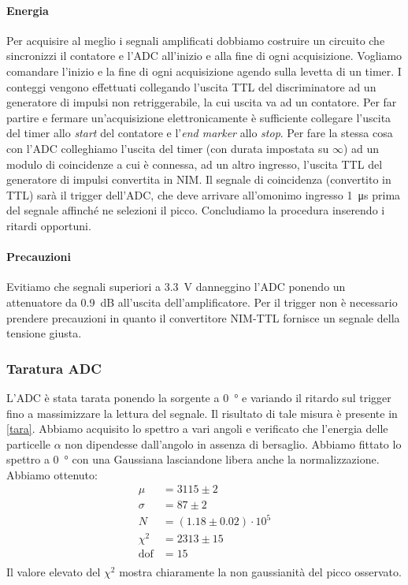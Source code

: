 \paragraph{Energia}
Per acquisire al meglio i segnali amplificati dobbiamo costruire un circuito che sincronizzi il contatore e l'ADC all'inizio e alla fine di ogni acquisizione.
Vogliamo comandare l'inizio e la fine di ogni acquisizione agendo sulla levetta di un timer.
I conteggi vengono effettuati collegando l'uscita TTL del discriminatore ad un generatore di impulsi non retriggerabile, la cui uscita va ad un contatore. Per far partire e fermare un'acquisizione elettronicamente è sufficiente collegare l'uscita del timer allo \emph{start} del contatore e l'\emph{end marker} allo \emph{stop}.
Per fare la stessa cosa con l'ADC colleghiamo l'uscita del timer (con durata impostata su $\infty$) ad un modulo di coincidenze a cui è connessa, ad un altro ingresso, l'uscita TTL del generatore di impulsi convertita in NIM. Il segnale di coincidenza (convertito in TTL) sarà il trigger dell'ADC, che deve arrivare all'omonimo ingresso \SI{1}{\micro s} prima del segnale affinché ne selezioni il picco.
Concludiamo la procedura inserendo i ritardi opportuni.

\paragraph{Precauzioni}
Evitiamo che segnali superiori a \SI{3.3}{V} danneggino l'ADC ponendo un attenuatore da \SI{0.9}{dB} all'uscita dell'amplificatore. Per il trigger non è necessario prendere precauzioni in quanto il convertitore NIM-TTL fornisce un segnale della tensione giusta. 


\subsubsection{Taratura ADC}
L'ADC è stata tarata ponendo la sorgente a \SI{0}{\degree} e variando il ritardo sul trigger fino a massimizzare la lettura del segnale. Il risultato di tale misura è presente in \autoref{tara}. Abbiamo acquisito lo spettro a vari angoli e verificato che l'energia delle particelle $\alpha$ non dipendesse dall'angolo in assenza di bersaglio. 
Abbiamo fittato lo spettro a \SI{0}{\degree} con una Gaussiana lasciandone libera anche la normalizzazione.\\
Abbiamo ottenuto:
\begin{align*}
\mu &=3115\pm2 \\
\sigma &= 87\pm2 \\
N &=(1.18\pm0.02)\cdot10^5 \\
\chi^2 &=2313\pm15 \\
\text{dof} &=15 \\
\end{align*}
Il valore elevato del $\chi^2$ mostra chiaramente la non gaussianità del picco osservato.


